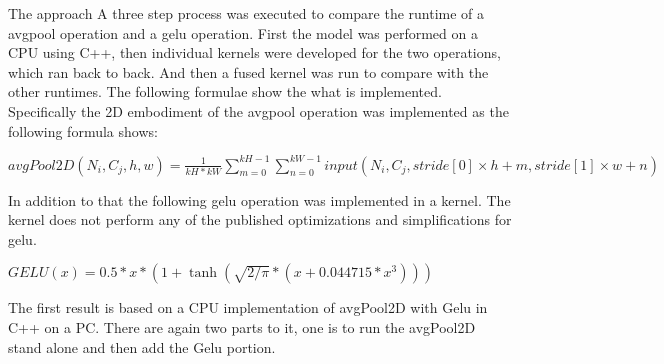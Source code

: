 \documentclass{article}
\begin{document}
The approach
A three step process was executed to compare the runtime of a avgpool operation and a gelu operation. First the model was performed on a CPU using C++, then individual kernels were developed for the two operations, which ran back to back. And then a fused kernel was run to compare with the other runtimes. The following formulae show the what is implemented. 
Specifically the 2D embodiment of the avgpool operation was implemented as the following formula shows:
 


\(avgPool2D(N_i, C_j, h, w)  = \frac{1}{kH * kW} \sum_{m=0}^{kH-1} \sum_{n=0}^{kW-1}
                               input(N_i, C_j, stride[0] \times h + m, stride[1] \times w + n)\)


In addition to that the following gelu operation was implemented in a kernel. The kernel does not perform any of the published optimizations and simplifications for gelu. 


\( GELU(x) = 0.5 * x * (1 + \tanh(\sqrt{2 / \pi} * (x + 0.044715 * x^3)))\)




The first result is based on a CPU implementation of avgPool2D with Gelu in C++ on a PC. There are again two parts to it, one is to run the avgPool2D stand alone and then add the Gelu portion. 



\end{document}
